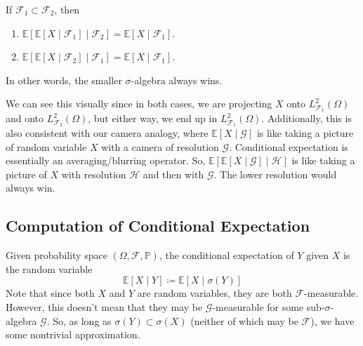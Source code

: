   \begin{theorem}
    If $\mathcal{F}_1 \subset \mathcal{F}_2$, then 
    \begin{enumerate}
      \item $\mathbb{E}[ \mathbb{E}[X \mid \mathcal{F}_1] \mid \mathcal{F}_2] = \mathbb{E}[X \mid \mathcal{F}_1]$. 
      \item $\mathbb{E}[ \mathbb{E}[X \mid \mathcal{F}_2] \mid \mathcal{F}_1] = \mathbb{E}[X \mid \mathcal{F}_1]$. 
    \end{enumerate}
    In other words, the smaller $\sigma$-algebra always wins. 
  \end{theorem}

  We can see this visually since in both cases, we are projecting $X$ onto $L^2_{\mathcal{F}_1} (\Omega)$ and onto $L^2_{\mathcal{F}_2} (\Omega)$, but either way, we end up in $L^2_{\mathcal{F}_1} (\Omega)$. Additionally, this is also consistent with our camera analogy, where $\mathbb{E}[X \mid \mathcal{G}]$ is like taking a picture of random variable $X$ with a camera of resolution $\mathcal{G}$. Conditional expectation is essentially an averaging/blurring operator. So, $\mathbb{E}[\mathbb{E}[X \mid \mathcal{G}] \mid \mathcal{H}]$ is like taking a picture of $X$ with resolution $\mathcal{H}$ and then with $\mathcal{G}$. The lower resolution would always win. 

\subsection{Computation of Conditional Expectation}

  \begin{definition}
    Given probability space $(\Omega, \mathcal{F}, \mathbb{P})$, the conditional expectation of $Y$ given $X$ is the random variable 
    \begin{equation}
      \mathbb{E}[X \mid Y] \coloneqq \mathbb{E}[X \mid \sigma(Y)]
    \end{equation}
    Note that since both $X$ and $Y$ are random variables, they are both $\mathcal{F}$-measurable. However, this doesn't mean that they may be $\mathcal{G}$-measurable for some sub-$\sigma$-algebra $\mathcal{G}$. So, as long as $\sigma(Y) \subset \sigma(X)$ (neither of which may be $\mathcal{F}$), we have some nontrivial approximation. 
  \end{definition}

